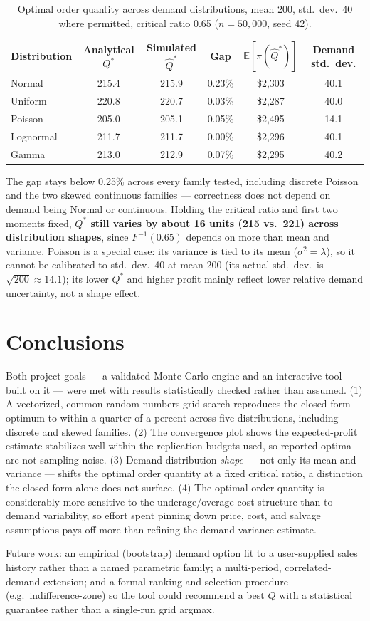 \documentclass[11pt]{article}
\begin{document}
\begin{table}[H]
\centering
\small
\begin{tabular}{lccccc}
\toprule
Distribution & Analytical $Q^*$ & Simulated $\hat{Q}^*$ & Gap & $\mathbb{E}[\pi(\hat{Q}^*)]$ & Demand std.\ dev. \\
\midrule
Normal & 215.4 & 215.9 & 0.23\% & \$2{,}303 & 40.1 \\
Uniform & 220.8 & 220.7 & 0.03\% & \$2{,}287 & 40.0 \\
Poisson & 205.0 & 205.1 & 0.05\% & \$2{,}495 & 14.1 \\
Lognormal & 211.7 & 211.7 & 0.00\% & \$2{,}296 & 40.1 \\
Gamma & 213.0 & 212.9 & 0.07\% & \$2{,}295 & 40.2 \\
\bottomrule
\end{tabular}
\caption{Optimal order quantity across demand distributions, mean 200, std.\ dev.\ 40 where
permitted, critical ratio 0.65 ($n=50{,}000$, seed 42).}
\label{tab:crossdist}
\end{table}

The gap stays below 0.25\% across every family tested, including discrete Poisson and the two
skewed continuous families --- correctness does not depend on demand being Normal or continuous.
Holding the critical ratio and first two moments fixed, \textbf{$Q^*$ still varies by about 16
units (215 vs.\ 221) across distribution shapes}, since $F^{-1}(0.65)$ depends on more than mean
and variance. Poisson is a special case: its variance is tied to its mean ($\sigma^2=\lambda$), so
it cannot be calibrated to std.\ dev.\ 40 at mean 200 (its actual std.\ dev.\ is
$\sqrt{200}\approx14.1$); its lower $Q^*$ and higher profit mainly reflect lower relative demand
uncertainty, not a shape effect.

\section*{Conclusions}
Both project goals --- a validated Monte Carlo engine and an interactive tool built on it --- were
met with results statistically checked rather than assumed. (1) A vectorized, common-random-numbers
grid search reproduces the closed-form optimum to within a quarter of a percent across five
distributions, including discrete and skewed families. (2) The convergence plot shows the
expected-profit estimate stabilizes well within the replication budgets used, so reported optima
are not sampling noise. (3) Demand-distribution \emph{shape} --- not only its mean and variance ---
shifts the optimal order quantity at a fixed critical ratio, a distinction the closed form alone
does not surface. (4) The optimal order quantity is considerably more sensitive to the
underage/overage cost structure than to demand variability, so effort spent pinning down price,
cost, and salvage assumptions pays off more than refining the demand-variance estimate.

Future work: an empirical (bootstrap) demand option fit to a user-supplied sales history rather
than a named parametric family; a multi-period, correlated-demand extension; and a formal
ranking-and-selection procedure (e.g.\ indifference-zone) so the tool could recommend a best $Q$
with a statistical guarantee rather than a single-run grid argmax.
\end{document}
